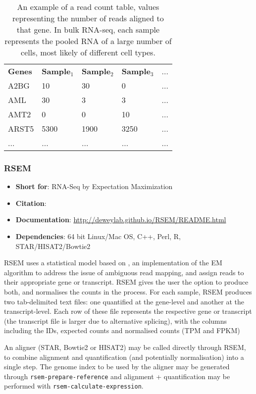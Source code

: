 \begin{table}[h]
\centering
\caption{An example of a read count table, values representing the number of reads aligned to that gene. In bulk RNA-seq, each sample represents the pooled RNA of a large number of cells, most likely of different cell types.}
\label{tab:read_count}
\begin{tabular}{lllll}
\textbf{Genes} & \textbf{Sample$_{1}$} & \textbf{Sample$_{2}$} & \textbf{Sample$_{3}$} & ...  \\
A2BG  & 10      & 30      & 0       & ...  \\
AML   & 30      & 3       & 3       & ...  \\
AMT2  & 0       & 0       & 10      & ...  \\
ARST5 & 5300    & 1900    & 3250    & ...  \\
...   & ...     & ...     & ...     & ... 
\end{tabular}
\end{table}

\subsubsection{RSEM}
\begin{itemize}\itemsep-0.5em
\item[] \textbf{Short for}: RNA-Seq by Expectation Maximization
\item[] \textbf{Citation}: 				\cite{li2011rsem}
\item[] \textbf{Documentation}: 	\url{http://deweylab.github.io/RSEM/README.html}
\item[] \textbf{Dependencies}: 64 bit Linux/Mac OS, C++, Perl, R, STAR/HISAT2/Bowtie2
\end{itemize}

RSEM uses a statistical model based on \cite{li2010rna}, an implementation of the EM algorithm to address the issue of ambiguous read mapping, and assign reads to their appropriate gene or transcript. RSEM gives the user the option to produce both, and normalises the counts in the process. For each sample, RSEM produces two tab-delimited text files: one quantified at the gene-level and another at the transcript-level. Each row of these file represents the respective gene or transcript (the transcript file is larger due to alternative splicing), with the columns including the IDs, expected counts and normalised counts (TPM and FPKM)

An aligner (STAR, Bowtie2 or HISAT2) may be called directly through RSEM, to combine alignment and quantification (and potentially normalisation) into a single step. The genome index to be used by the aligner may be generated through \texttt{rsem-prepare-reference} and alignment + quantification may be performed with \texttt{rsem-calculate-expression}.

